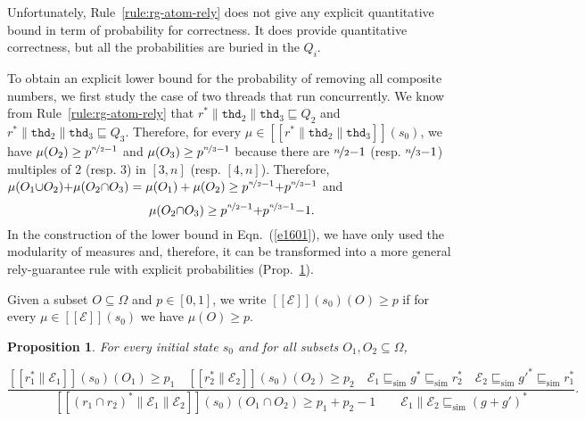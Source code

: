 \documentclass[review]{elsart}
\newtheorem{proposition}[definition]{Proposition}
\newcommand{\EE}{\mathcal{E}}
\newcommand{\sem}[1]{[\![#1]\!]}
\newcommand{\bks}{*}
\newcommand{\refby}{\sqsubseteq}
\newcommand{\simref}{\refby_{\mathrm{sim}}}
\newcommand{\thread}{\mathtt{thd}}
\newcommand{\Eqn}[1]{Eqn.~(\ref{#1})}
\newcommand{\Prop}[1]{Prop.~\ref{#1}}
\begin{document}
Unfortunately, Rule~\ref{rule:rg-atom-rely} does not give any explicit quantitative bound in term of probability for correctness. It does provide quantitative correctness, but all the probabilities are buried in the $Q_i$.

To obtain an explicit lower bound for the probability of removing all composite numbers, we first study the case of two threads that run concurrently. We know from Rule~\ref{rule:rg-atom-rely} that $r^{\bks}\|\thread_2\|\thread_3\refby Q_2$ and $r^{\bks}\|\thread_2\|\thread_3\refby Q_3$. Therefore, for every $\mu{\in}\sem{r^{\bks}\|\thread_2\|\thread_3}(s_0)$, we have $\mu(O_2)\geq p^{\nicefrac{n}{2}{-}1}$ and $\mu(O_3)\geq p^{\nicefrac{n}{3}{-}1}$ because there are $\nicefrac{n}{2}{-}1$ (resp. $\nicefrac{n}{3}{-}1$) multiples of $2$ (resp. $3$) in $[3,n]$ (resp. $[4,n]$). Therefore, $\mu(O_1{\cup} O_2) {+} \mu(O_2{\cap} O_3) = \mu(O_1) + \mu(O_2) \geq p^{\nicefrac{n}{2}{-}1} {+} p^{\nicefrac{n}{3}{-}1}$ and 
\begin{equation}\label{e1601}
	\mu(O_2{\cap} O_3) \geq p^{\nicefrac{n}{2}{-}1} {+} p^{\nicefrac{n}{3}{-}1} {-} 1.
\end{equation}
In the construction of the lower bound in \Eqn{e1601}, we have only used the modularity of measures and, therefore, it can be transformed into a more general rely-guarantee rule with explicit probabilities (\Prop{p1605}).

Given a subset $O{\subseteq}\Omega$ and $p{\in}[0,1]$, we write $\sem{\EE}(s_0)(O)\geq p$ if for every $\mu{\in}\sem{\EE}(s_0)$ we have $\mu(O)\geq p$. 

\begin{proposition}\label{p1605}
For every initial state $s_0$ and for all subsets $O_1,O_2{\subseteq}\Omega$,
\begin{footnotesize}
\begin{displaymath}
\frac{\sem{r_1^{\bks}\|\EE_1}(s_0)(O_1)\geq p_1\quad \sem{r_2^{\bks}\|\EE_2}(s_0)(O_2)\geq p_2\quad \EE_1\simref g^{\bks}\simref r_2^{\bks}\quad \EE_2\simref g'^{\bks}\simref r_1^{\bks}}{\sem{(r_1{\cap} r_2)^{\bks}\|\EE_1\|\EE_2}(s_0)(O_1{\cap} O_2)\geq p_1 {+} p_2 {-} 1\qquad \EE_1\|\EE_2\simref (g{+} g')^{\bks}}
.
\end{displaymath}
\end{footnotesize}
\end{proposition}
\end{document}
